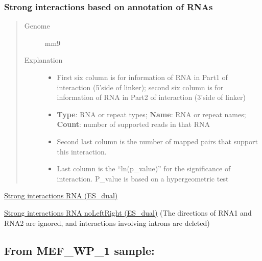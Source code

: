 \documentclass[letterpaper,10pt,english]{sphinxmanual}
\begin{document}
\subsubsection{Strong interactions based on annotation of RNAs}
\label{Data_Resources:id2}\begin{quote}\begin{description}
\item[{Genome}] \leavevmode
mm9

\item[{Explanation}] \leavevmode\begin{itemize}
\item {} 
First six column is for information of RNA in Part1 of interaction (5'side of linker); second six column is for information of RNA in Part2 of interaction (3'side of linker)

\item {} 
\textbf{Type}: RNA or repeat types; \textbf{Name}: RNA or repeat names; \textbf{Count}: number of supported reads in that RNA

\item {} 
Second last column is the number of mapped pairs that support this interaction.

\item {} 
Last column is the ``ln(p\_value)'' for the significance of interaction. P\_value is based on a hypergeometric test

\end{itemize}

\end{description}\end{quote}

\href{http://systemsbio.ucsd.edu/RNA-Hi-C/Data/AATG\_interaction\_clusters\_RNA.xlsx}{Strong interactions RNA (ES\_dual)}

\href{http://systemsbio.ucsd.edu/RNA-Hi-C/Data/AATG\_interaction\_clusters\_RNA\_noLeftRight.xlsx}{Strong interactions RNA noLeftRight (ES\_dual)} (The directions of RNA1 and RNA2 are ignored, and interactions involving introns are deleted)


\subsection{From MEF\_WP\_1 sample:}
\label{Data_Resources:from-mef-wp-1-sample}
\end{document}
